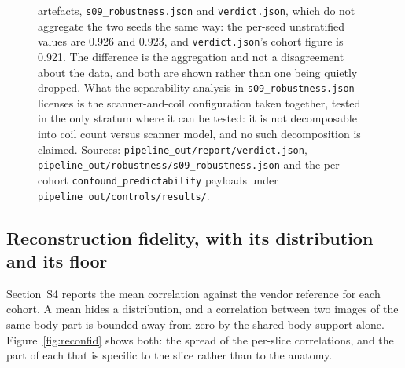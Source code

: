 \documentclass[11pt,a4paper]{article}
\begin{document}
\begin{figure}[htbp]
{artefacts, \texttt{s09\_robustness.json} and \texttt{verdict.json}, which do not
aggregate the two seeds the same way: the per-seed unstratified values are 0.926
and 0.923, and \texttt{verdict.json}'s cohort figure is 0.921. The difference is
the aggregation and not a disagreement about the data, and both are shown rather
than one being quietly dropped. What the separability analysis in
\texttt{s09\_robustness.json} licenses is the scanner-and-coil configuration
taken together, tested in the only stratum where it can be tested: it is not
decomposable into coil count versus scanner model, and no such decomposition is
claimed. Sources: \texttt{pipeline\_out/report/verdict.json},
\texttt{pipeline\_out/robustness/s09\_robustness.json} and the per-cohort
\texttt{confound\_predictability} payloads under
\texttt{pipeline\_out/controls/results/}.}
\label{fig:confound}
\end{figure}

\subsection{Reconstruction fidelity, with its distribution and its floor}

Section~S4 reports the mean correlation against the vendor reference for each cohort.
A mean hides a distribution, and a correlation between two images of the same body part
is bounded away from zero by the shared body support alone. Figure~\ref{fig:reconfid}
shows both: the spread of the per-slice correlations, and the part of each that is
specific to the slice rather than to the anatomy.
\end{document}
